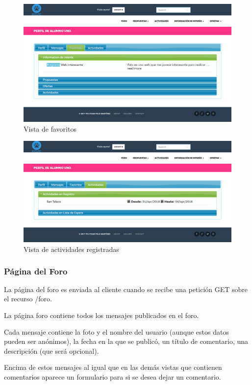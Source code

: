 \begin{figure}[H]
   \centering
   \includegraphics[width=12cm]{img/perfil_favoritos}
   \caption{Vista de favoritos}
   \label{figura:perfil_favoritos}
\end{figure}
\begin{figure}[H]
   \centering
   \includegraphics[width=12cm]{img/perfil_actividades}
   \caption{Vista de actividades registradas}
   \label{figura:perfil_actividades}
\end{figure}
        
        
\subsubsection{Página del Foro}
\label{subsubsec:foro}

La página del foro es enviada al cliente cuando se recibe una petición GET sobre el recurso /foro.


La página foro contiene todos los mensajes publicados en el foro.


Cada mensaje contiene la foto y el nombre del usuario (aunque estos datos pueden ser anónimos), la fecha en la que se publicó, un título de comentario, una descripción (que será opcional).


Encima de estos mensajes al igual que en las demás vistas que contienen comentarios aparece un formulario para si se desea dejar un comentario.

